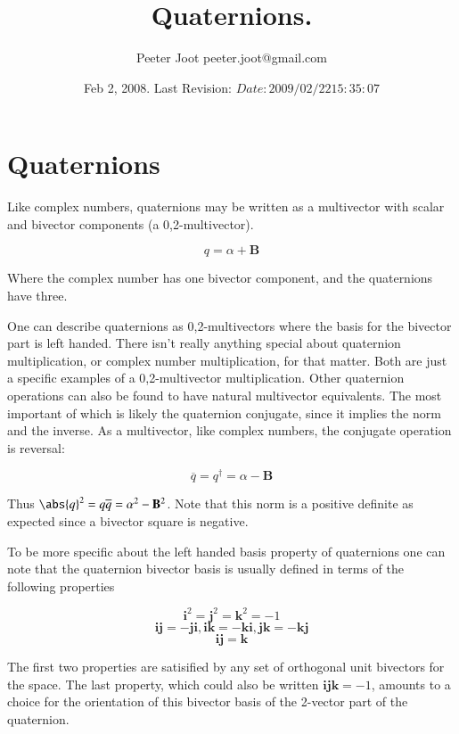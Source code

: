 \documentclass{article}      %
\title{Quaternions.} %
\author{Peeter Joot \quad peeter.joot@gmail.com}         %
\date{ Feb 2, 2008.  Last Revision: $Date: 2009/02/22 15:35:07 $ }
\begin{document}

\maketitle{}

\section{Quaternions}

Like complex numbers, quaternions may be written as a multivector with scalar and bivector components (a 0,2-multivector).

\[
q = \alpha + \mathbf{B}
\]

Where the complex number has one bivector component, and the quaternions have three.

One can describe quaternions as 0,2-multivectors where the basis for the bivector part is left handed.  There isn't really anything special about quaternion multiplication, or complex number multiplication, for that matter.  Both are just a specific examples of a 0,2-multivector multiplication.  Other quaternion operations can also be found to have natural multivector equivalents.  The most important of which is likely the quaternion conjugate, since it implies the norm and the inverse.  As a multivector, like complex numbers, the conjugate operation is reversal:

\[
\overline{q} = q^\dagger = \alpha - \mathbf{B}
\]

Thus $\abs{q}^2 = q\overline{q} = \alpha^2 - \mathbf{B}^2$.  Note that this norm is a positive definite as expected since a bivector square is negative.

To be more specific about the left handed basis property of quaternions one can note that the quaternion bivector basis is usually defined in terms of the following properties

\[
\mathbf{i}^2 = \mathbf{j}^2 = \mathbf{k}^2 = -1
\]
\[
\mathbf{i}\mathbf{j} = -\mathbf{j}\mathbf{i}, \mathbf{i}\mathbf{k} = -\mathbf{k}\mathbf{i}, \mathbf{j}\mathbf{k} = -\mathbf{k}\mathbf{j}
\]
\[
\mathbf{i}\mathbf{j} = \mathbf{k}
\]

The first two properties are satisified by any set of orthogonal unit bivectors for the space.  The last property, which could also be written $\mathbf{i}\mathbf{j}\mathbf{k} = -1$, amounts to a choice for the orientation of this bivector basis of the 2-vector part of the quaternion.
\end{document}
